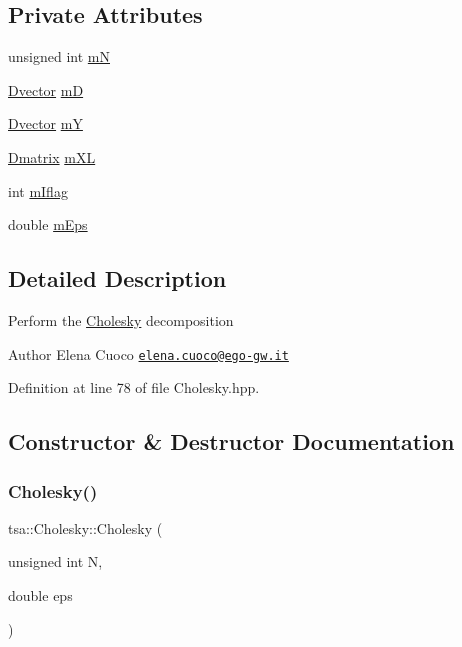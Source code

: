 \subsection*{Private Attributes}
\begin{DoxyCompactItemize}
\item 
unsigned int \hyperlink{classtsa_1_1_cholesky_aeebdfa1ac318dceb73fccfe75f3928bc}{mN}
\item 
\hyperlink{namespacetsa_a8900fb03d849baf447a1a0efe2561fb2}{Dvector} \hyperlink{classtsa_1_1_cholesky_afb8463f2c148c8ae2ef2c2914074718a}{mD}
\item 
\hyperlink{namespacetsa_a8900fb03d849baf447a1a0efe2561fb2}{Dvector} \hyperlink{classtsa_1_1_cholesky_a71ce7b253e3824f3629ca31ba049f58e}{mY}
\item 
\hyperlink{namespacetsa_ad260cd21c1891c4ed391fe788569aba4}{Dmatrix} \hyperlink{classtsa_1_1_cholesky_a56d3135a9c56e030e9cf876fd99dbbc3}{m\+XL}
\item 
int \hyperlink{classtsa_1_1_cholesky_afc88d4ebf8b5a163a77ef3e3dd90f99d}{m\+Iflag}
\item 
double \hyperlink{classtsa_1_1_cholesky_aa49812e981a177f6792389d0d760db52}{m\+Eps}
\end{DoxyCompactItemize}


\subsection{Detailed Description}
Perform the \hyperlink{classtsa_1_1_cholesky}{Cholesky} decomposition

\begin{DoxyAuthor}{Author}
Elena Cuoco \href{mailto:elena.cuoco@ego-gw.it}{\tt elena.\+cuoco@ego-\/gw.\+it} 
\end{DoxyAuthor}


Definition at line 78 of file Cholesky.\+hpp.



\subsection{Constructor \& Destructor Documentation}
\mbox{\label{classtsa_1_1_cholesky_a19dfa3cb6bf14721a91ec6fdcb26dbcf}} 
\subsubsection{\texorpdfstring{Cholesky()}{Cholesky()}\hspace{0.1cm}{\footnotesize\ttfamily [1/2]}}
{\footnotesize\ttfamily tsa\+::\+Cholesky\+::\+Cholesky (\begin{DoxyParamCaption}\item[{unsigned int}]{N,  }\item[{double}]{eps }\end{DoxyParamCaption})}

